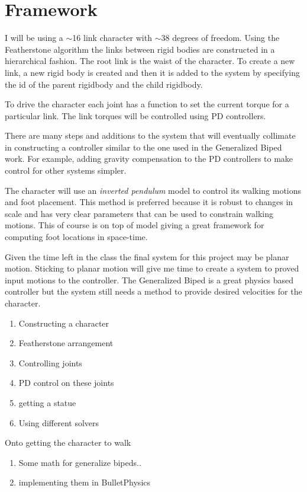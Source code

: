 
\section{Framework}
\label{sec:framework}

I will be using a $\sim$16 link character with $\sim$38 degrees of freedom. 
Using the Featherstone algorithm the links between rigid bodies are constructed in a hierarchical fashion. 
The root link is the waist of the character. 
To create a new link, a new rigid body is created and then it is added to the system by specifying the id of the parent rigidbody and the child rigidbody.

To drive the character each joint has a function to set the current torque for a particular link.
The link torques will be controlled using PD controllers.

There are many steps and additions to the system that will eventually collimate in constructing a controller similar to the one used in the Generalized Biped work. 
For example, adding gravity compensation to the PD controllers to make control for other systems simpler.

The character will use an \emph{inverted pendulum} model to control its walking motions and foot placement. 
This method is preferred because it is robust to changes in scale and has very clear parameters that can be used to constrain walking motions. This of course is on top of model giving a great framework for computing foot locations in space-time.


Given the time left in the class the final system for this project may be planar motion.
Sticking to planar motion will give me time to create a system to proved input motions to the controller. 
The Generalized Biped is a great physics based controller but the system still needs a method to provide desired velocities for the character. 


\begin{enumerate}
	\item Constructing a character
	\item Featherstone arrangement
	\item Controlling joints
	\item PD control on these joints
	\item getting a statue
	\item Using different solvers	
\end{enumerate}

Onto getting the character to walk

\begin{enumerate}
	\item Some math for generalize bipeds..
	\item implementing them in BulletPhysics
\end{enumerate}